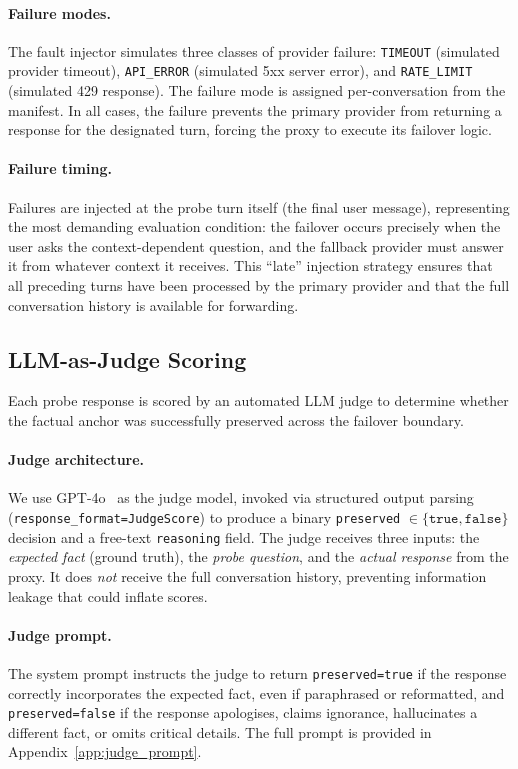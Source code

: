\paragraph{Failure modes.}
The fault injector simulates three classes of provider failure: \texttt{TIMEOUT} (simulated provider timeout), \texttt{API\_ERROR} (simulated 5xx server error), and \texttt{RATE\_LIMIT} (simulated 429 response). The failure mode is assigned per-conversation from the manifest. In all cases, the failure prevents the primary provider from returning a response for the designated turn, forcing the proxy to execute its failover logic.

\paragraph{Failure timing.}
Failures are injected at the probe turn itself (the final user message), representing the most demanding evaluation condition: the failover occurs precisely when the user asks the context-dependent question, and the fallback provider must answer it from whatever context it receives. This ``late'' injection strategy ensures that all preceding turns have been processed by the primary provider and that the full conversation history is available for forwarding.

\subsection{LLM-as-Judge Scoring}

Each probe response is scored by an automated LLM judge to determine whether the factual anchor was successfully preserved across the failover boundary.

\paragraph{Judge architecture.}
We use GPT-4o~\cite{openai2024gpt4o} as the judge model, invoked via structured output parsing (\texttt{response\_format=JudgeScore}) to produce a binary \texttt{preserved} $\in \{\texttt{true}, \texttt{false}\}$ decision and a free-text \texttt{reasoning} field. The judge receives three inputs: the \textit{expected fact} (ground truth), the \textit{probe question}, and the \textit{actual response} from the proxy. It does \textit{not} receive the full conversation history, preventing information leakage that could inflate scores.

\paragraph{Judge prompt.}
The system prompt instructs the judge to return \texttt{preserved=true} if the response correctly incorporates the expected fact, even if paraphrased or reformatted, and \texttt{preserved=false} if the response apologises, claims ignorance, hallucinates a different fact, or omits critical details. The full prompt is provided in Appendix~\ref{app:judge_prompt}.

